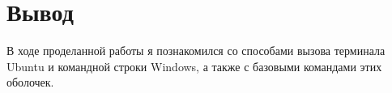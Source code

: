 \chapter{Вывод}
\label{ch:chap3}

В ходе проделанной работы я познакомился со способами вызова терминала Ubuntu и командной строки Windows, а также с базовыми командами этих оболочек.

\endinput